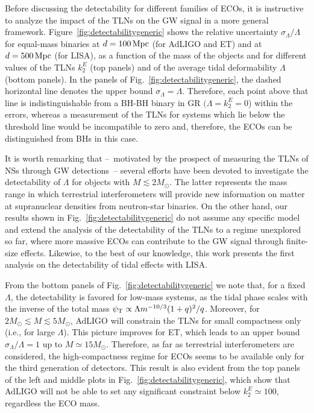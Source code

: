 \documentclass[aps,twocolumn,showpacs,preprintnumbers,nofootinbib,prd,superscriptaddress,groupedaddress,10pt]{revtex4-1}
\newcommand{\tn}{\textnormal}
\begin{document}
Before discussing the detectability for different families of ECOs, it is instructive 
to analyze the impact of the TLNs on the GW signal in a more general framework. 
Figure~\ref{fig:detectabilitygeneric} shows the relative uncertainty $\sigma_\Lambda/\Lambda$ 
for equal-mass binaries at $d=100\,{\rm Mpc}$ (for AdLIGO and ET) and at $d=500\,{\rm Mpc}$ (for LISA), as a function of the mass of the objects and for different values of the TLNs $k_2^E$ (top panels) and of the average tidal deformability $\Lambda$ (bottom panels).
%
In the panels of Fig.~\ref{fig:detectabilitygeneric}, the dashed horizontal line denotes the upper bound $\sigma_\Lambda=\Lambda$. Therefore, each point above that line is indistinguishable from a BH-BH binary in GR $(\Lambda=k_2^E=0$) within the errors, whereas a measurement of the TLNs for systems which lie below the threshold line would be incompatible to zero and, therefore, the ECOs can be distinguished from BHs in this case.



It is worth remarking that --~motivated by the prospect of measuring the TLNs of NSs through GW detections~-- several efforts have been devoted to investigate the detectability of $\Lambda$ for objects with $M\lesssim 2M_\odot$. The latter represents the mass range in which terrestrial interferometers will provide new information on matter at supranuclear densities from 
neutron-star binaries. On the other hand, our results shown in Fig.~\ref{fig:detectabilitygeneric} do not assume any specific model and extend the analysis of the detectability of the TLNs to a regime unexplored so far, where more massive ECOs can contribute to the GW signal through 
finite-size effects. Likewise, to the best of our knowledge, this work presents the first analysis on the detectability of tidal effects with LISA.

From the bottom panels of Fig.~\ref{fig:detectabilitygeneric} we note that, for a fixed $\Lambda$, the detectability is favored for low-mass systems, as the 
tidal phase scales with the inverse of the total mass $\psi_\tn{T}\propto \Lambda m^{-10/3}(1+q)^2/q$. 
Moreover, for $2M_\odot\lesssim M\lesssim 5M_\odot$, 
AdLIGO will constrain the TLNs for small compactness only (i.e., for large $\Lambda$). 
This picture improves for ET, which leads to an upper bound $\sigma_\Lambda/\Lambda=1$ 
up to $M\simeq 15 M_\odot$. Therefore, as far as terrestrial interferometers are considered, the high-compactness 
regime for ECOs seems to be available only for the third generation of detectors.
This result is also evident from the top panels of the left and middle plots in Fig.~\ref{fig:detectabilitygeneric}, which show that AdLIGO will not be able to set any significant constraint below $k_2^E\simeq 100$, regardless the ECO mass.
\end{document}
